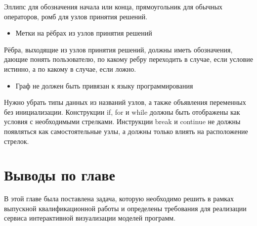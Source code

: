 Эллипс для обозначения начала или конца, прямоугольник для обычных операторов, ромб для узлов принятия решений.
\begin{itemize}
\item Метки на рёбрах из узлов принятия решений
\end{itemize}
Рёбра, выходящие из узлов принятия решений, должны иметь обозначения, дающие понять пользователю, по какому ребру переходить в случае, если условие истинно, а по какому в случае, если ложно.
\begin{itemize}
\item Граф не должен быть привязан к языку программирования
\end{itemize}
Нужно убрать типы данных из названий узлов, а также объявления переменных без инициализации. Конструкции if, for и while должны быть отображены как условия с необходимыми стрелками. Инструкции break и continue не должны появляться как самостоятельные узлы, а должны только влиять на расположение стрелок.
\section{Выводы по главе} \label{ch3:sec3}
В этой главе была поставлена задача, которую необходимо решить в рамках выпускной квалификационной работы и определены требования для реализации сервиса интерактивной визуализации моделей программ.
\newpage





%	
%
%
%
%
%
%
%
